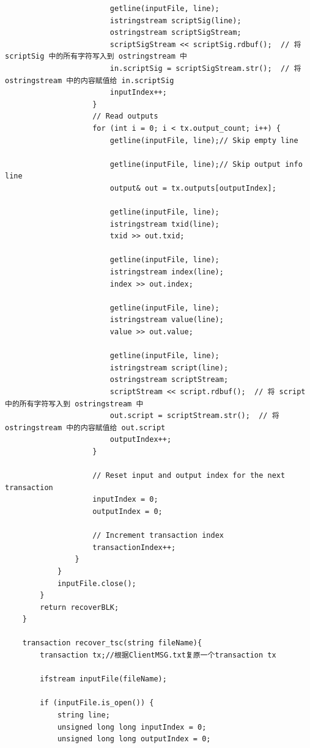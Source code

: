 \documentclass[10pt,a4paper]{article}
\begin{document}
\begin{verbatim}
                        getline(inputFile, line);
                        istringstream scriptSig(line);
                        ostringstream scriptSigStream;
                        scriptSigStream << scriptSig.rdbuf();  // 将 scriptSig 中的所有字符写入到 ostringstream 中
                        in.scriptSig = scriptSigStream.str();  // 将 ostringstream 中的内容赋值给 in.scriptSig
                        inputIndex++;
                    }
                    // Read outputs
                    for (int i = 0; i < tx.output_count; i++) {
                        getline(inputFile, line);// Skip empty line
    
                        getline(inputFile, line);// Skip output info line
                        output& out = tx.outputs[outputIndex];
    
                        getline(inputFile, line);
                        istringstream txid(line);
                        txid >> out.txid;
    
                        getline(inputFile, line);
                        istringstream index(line);
                        index >> out.index;
    
                        getline(inputFile, line);
                        istringstream value(line);
                        value >> out.value;
    
                        getline(inputFile, line);
                        istringstream script(line);
                        ostringstream scriptStream;
                        scriptStream << script.rdbuf();  // 将 script 中的所有字符写入到 ostringstream 中
                        out.script = scriptStream.str();  // 将 ostringstream 中的内容赋值给 out.script
                        outputIndex++;
                    }
    
                    // Reset input and output index for the next transaction
                    inputIndex = 0;
                    outputIndex = 0;
    
                    // Increment transaction index
                    transactionIndex++;
                }
            }
            inputFile.close();
        }
        return recoverBLK;
    }
    
    transaction recover_tsc(string fileName){
        transaction tx;//根据ClientMSG.txt复原一个transaction tx
        
        ifstream inputFile(fileName);
    
        if (inputFile.is_open()) {
            string line;
            unsigned long long inputIndex = 0;
            unsigned long long outputIndex = 0;
    

\end{verbatim}
\end{document}
